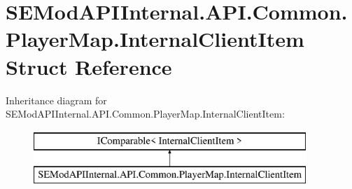 \hypertarget{struct_s_e_mod_a_p_i_internal_1_1_a_p_i_1_1_common_1_1_player_map_1_1_internal_client_item}{}\section{S\+E\+Mod\+A\+P\+I\+Internal.\+A\+P\+I.\+Common.\+Player\+Map.\+Internal\+Client\+Item Struct Reference}
\label{struct_s_e_mod_a_p_i_internal_1_1_a_p_i_1_1_common_1_1_player_map_1_1_internal_client_item}
Inheritance diagram for S\+E\+Mod\+A\+P\+I\+Internal.\+A\+P\+I.\+Common.\+Player\+Map.\+Internal\+Client\+Item\+:\begin{figure}[H]
\begin{center}
\leavevmode
\includegraphics[height=2.000000cm]{struct_s_e_mod_a_p_i_internal_1_1_a_p_i_1_1_common_1_1_player_map_1_1_internal_client_item}
\end{center}
\end{figure}
